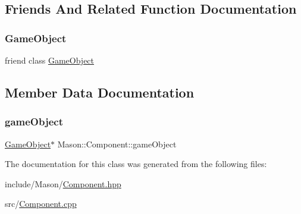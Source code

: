\subsection{Friends And Related Function Documentation}
\hypertarget{class_mason_1_1_component_a00df87c957d8f7ee0fc51f07a0542f4a}{}\label{class_mason_1_1_component_a00df87c957d8f7ee0fc51f07a0542f4a} 
\subsubsection{\texorpdfstring{Game\+Object}{GameObject}}
{\footnotesize\ttfamily friend class \hyperlink{class_mason_1_1_game_object}{Game\+Object}\hspace{0.3cm}{\ttfamily [friend]}}



\subsection{Member Data Documentation}
\hypertarget{class_mason_1_1_component_a30030370c35f5562cbbbb0927b0448c8}{}\label{class_mason_1_1_component_a30030370c35f5562cbbbb0927b0448c8} 
\subsubsection{\texorpdfstring{game\+Object}{gameObject}}
{\footnotesize\ttfamily \hyperlink{class_mason_1_1_game_object}{Game\+Object}$\ast$ Mason\+::\+Component\+::game\+Object\hspace{0.3cm}{\ttfamily [protected]}}



The documentation for this class was generated from the following files\+:\begin{DoxyCompactItemize}
\item 
include/\+Mason/\hyperlink{_component_8hpp}{Component.\+hpp}\item 
src/\hyperlink{_component_8cpp}{Component.\+cpp}\end{DoxyCompactItemize}

